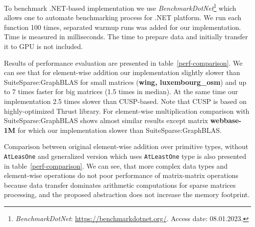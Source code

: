 To benchmark .NET-based implementation we use \textit{BenchmarkDotNet}\footnote{\textit{BenchmarkDotNet}: \url{https://benchmarkdotnet.org/}. Access date: 08.01.2023.} which allows one to automate benchmarking process for .NET platform.
We run each function 100 times, separated warmup runs was added for our implementation.  
Time is measured in milliseconds. The time to prepare data and initially transfer it to GPU is not included.

Results of performance evaluation are presented in table~\ref{perf-comparison}.
We can see that for element-wise addition our implementation slightly slower than SuiteSparse:GraphBLAS for small matrices (\textbf{wing, luxembourg\_osm}) and up to 7 times faster for big matrices (1.5 times in median). At the same time our implementation 2.5 times slower than CUSP-based. Note that CUSP is based on highly-optimized Thrust library. For element-wise multiplication comparison with SuiteSparse:GraphBLAS shows almost similar results except matrix \textbf{webbase-1M} for which our implementation slower than SuiteSparse:GraphBLAS.

Comparison between original element-wise addition over primitive types, without \texttt{AtLeasOne} and generalized version which uses \texttt{AtLeastOne} type is also presented in table~\ref{perf-comparison}.
We can see, that more complex data types and element-wise operations do not poor performance of matrix-matrix operations because data transfer dominates arithmetic computations for sparse matrices processing, and the proposed abstraction does not increase the memory footprint.
